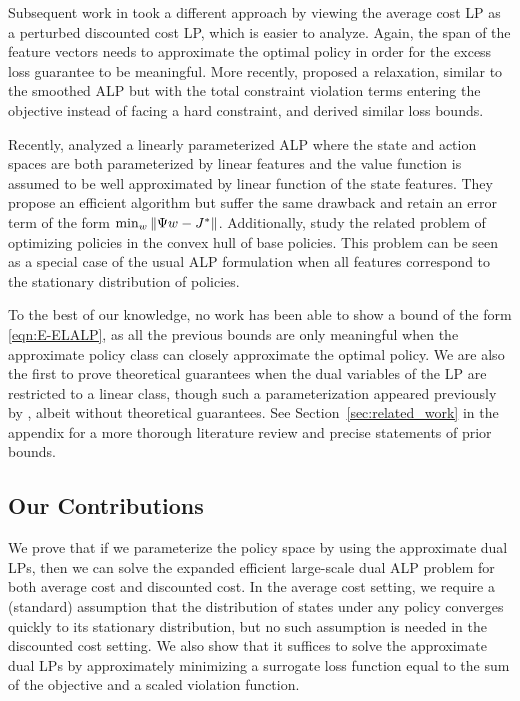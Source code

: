 \documentclass[11pt]{article}
\newcounter{assumption}%
\begin{document}
Subsequent work in \cite{DeFarias-VanRoy-2006} took a different approach by viewing the average cost LP as a perturbed discounted cost LP, which is easier to analyze. Again, the span of the feature vectors needs to approximate the optimal policy in order for the excess loss guarantee to be meaningful. More recently, \cite{Veatch-2013} proposed a relaxation, similar to the smoothed ALP but with the total constraint violation terms entering the objective instead of facing a hard constraint, and derived similar loss bounds. 

Recently, \cite{chen2018scalable} analyzed a linearly parameterized ALP where the state and action spaces are both parameterized by linear features and the value function is assumed to be well approximated by linear function of the state features. They propose an efficient algorithm but suffer the same drawback and retain an error term of the form $\min_w\left\Vert\Psi w - J^*\right\Vert$. Additionally, \cite{banijamali2018optimizing} study the related problem of optimizing policies in the convex hull of base policies. This problem can be seen as a special case of the usual ALP formulation when all features correspond to the stationary distribution of policies. 

To the best of our knowledge, no work has been able to show a bound of the form \eqref{eqn:E-ELALP}, as all the previous bounds are only meaningful when the approximate policy class can closely approximate the optimal policy. We are also the first to prove theoretical guarantees when the dual variables of the LP are restricted to a linear class, though such a parameterization appeared previously by \cite{Wang-Lizotte-Bowling-Schuurmans-2008}, albeit without theoretical guarantees. See Section~\ref{sec:related_work} in the appendix for a more thorough literature review and precise statements of prior bounds. 


\subsection{Our Contributions}
We prove that if we parameterize the policy space by using the approximate dual LPs, then we can solve the expanded efficient large-scale dual ALP problem for both average cost and discounted cost. In the average cost setting, we require a (standard) assumption that the distribution of states under any policy converges quickly to its stationary distribution, but no such assumption is needed in the discounted cost setting. We also show that it suffices to solve the approximate dual LPs by approximately minimizing a surrogate loss function equal to the sum of the objective and a scaled violation function. 
\end{document}

